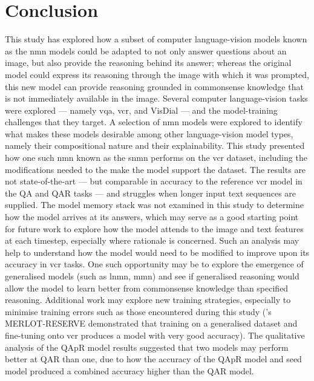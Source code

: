 \chapter{Conclusion}
\label{chp:conclusion}

This study has explored how a subset of computer language-vision models known as the \gls{nmn} models could be adapted to not only answer questions about an image, but also provide the reasoning behind its answer; whereas the original model could express its reasoning through the image with which it was prompted, this new model can provide reasoning grounded in commonsense knowledge that is not immediately available in the image.
Several computer language-vision tasks were explored --- namely \gls{vqa}, \gls{vcr}, and VisDial --- and the model-training challenges that they target.
A selection of \gls{nmn} models were explored to identify what makes these models desirable among other language-vision model types, namely their compositional nature and their explainability.
This study presented how one such \gls{nmn} known as the \gls{snmn} performs on the \gls{vcr} dataset, including the modifications needed to the make the model support the dataset.
The results are not state-of-the-art --- but comparable in accuracy to the reference \gls{vcr} model in the Q\rightarrow{}A and QA\rightarrow{}R tasks --- and struggles when longer input text sequences are supplied.
The model memory stack was not examined in this study to determine how the model arrives at its answers, which may serve as a good starting point for future work to explore how the model attends to the image and text features at each timestep, especially where rationale is concerned.
Such an analysis may help to understand how the model would need to be modified to improve upon its accuracy in \gls{vcr} tasks.
One such opportunity may be to explore the emergence of generalised models (such as \gls{lnmn}, \gls{mmn}) and see if generalised reasoning would allow the model to learn better from commonsense knowledge than specified reasoning.
Additional work may explore new training strategies, especially to minimise training errors such as those encountered during this study (\citeauthor{zellers_merlot_2022}'s MERLOT-RESERVE demonstrated that training on a generalised dataset and fine-tuning onto \gls{vcr} produces a model with very good accuracy).
The qualitative analysis of the QAp\rightarrow{}R model results suggested that two models may perform better at Q\rightarrow{}AR than one, due to how the accuracy of the QAp\rightarrow{}R model and seed model produced a combined accuracy higher than the Q\rightarrow{}AR model.
